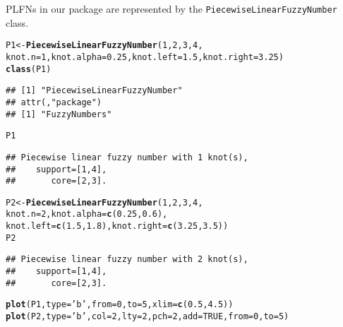 \documentclass[11pt]{article}\usepackage[]{graphicx}\usepackage[]{color}
\makeatletter
\newcommand{\hlnum}[1]{\textcolor[rgb]{0.686,0.059,0.569}{#1}}%
\newcommand{\hlstr}[1]{\textcolor[rgb]{0.192,0.494,0.8}{#1}}%
\newcommand{\hlstd}[1]{\textcolor[rgb]{0.345,0.345,0.345}{#1}}%
\newcommand{\hlkwb}[1]{\textcolor[rgb]{0.69,0.353,0.396}{#1}}%
\newcommand{\hlkwc}[1]{\textcolor[rgb]{0.333,0.667,0.333}{#1}}%
\newcommand{\hlkwd}[1]{\textcolor[rgb]{0.737,0.353,0.396}{\textbf{#1}}}%
\newenvironment{kframe}{%
 \def\at@end@of@kframe{}%
 \ifinner\ifhmode%
  \def\at@end@of@kframe{\end{minipage}}%
  \begin{minipage}{\columnwidth}%
 \fi\fi%
 \def\FrameCommand##1{\hskip\@totalleftmargin \hskip-\fboxsep
 \colorbox{shadecolor}{##1}\hskip-\fboxsep
     \hskip-\linewidth \hskip-\@totalleftmargin \hskip\columnwidth}%
 \MakeFramed {\advance\hsize-\width
   \@totalleftmargin\z@ \linewidth\hsize
   \@setminipage}}%
 {\par\unskip\endMakeFramed%
 \at@end@of@kframe}
\newenvironment{knitrout}{}{} %
\makeatother
\begin{document}
\bigskip
PLFNs in our package are represented by the \texttt{PiecewiseLinearFuzzyNumber} class.

\begin{knitrout}\small
{}\color{fgcolor}\begin{kframe}
\begin{alltt}
\hlstd{P1} \hlkwb{<-} \hlkwd{PiecewiseLinearFuzzyNumber}\hlstd{(}\hlnum{1}\hlstd{,} \hlnum{2}\hlstd{,} \hlnum{3}\hlstd{,} \hlnum{4}\hlstd{,}
   \hlkwc{knot.n}\hlstd{=}\hlnum{1}\hlstd{,} \hlkwc{knot.alpha}\hlstd{=}\hlnum{0.25}\hlstd{,} \hlkwc{knot.left}\hlstd{=}\hlnum{1.5}\hlstd{,} \hlkwc{knot.right}\hlstd{=}\hlnum{3.25}\hlstd{)}
\hlkwd{class}\hlstd{(P1)}
\end{alltt}
\begin{verbatim}
## [1] "PiecewiseLinearFuzzyNumber"
## attr(,"package")
## [1] "FuzzyNumbers"
\end{verbatim}
\begin{alltt}
\hlstd{P1}
\end{alltt}
\begin{verbatim}
## Piecewise linear fuzzy number with 1 knot(s),
##    support=[1,4],
##       core=[2,3].
\end{verbatim}
\begin{alltt}
\hlstd{P2} \hlkwb{<-} \hlkwd{PiecewiseLinearFuzzyNumber}\hlstd{(}\hlnum{1}\hlstd{,} \hlnum{2}\hlstd{,} \hlnum{3}\hlstd{,} \hlnum{4}\hlstd{,}
   \hlkwc{knot.n}\hlstd{=}\hlnum{2}\hlstd{,} \hlkwc{knot.alpha}\hlstd{=}\hlkwd{c}\hlstd{(}\hlnum{0.25}\hlstd{,}\hlnum{0.6}\hlstd{),}
   \hlkwc{knot.left}\hlstd{=}\hlkwd{c}\hlstd{(}\hlnum{1.5}\hlstd{,}\hlnum{1.8}\hlstd{),} \hlkwc{knot.right}\hlstd{=}\hlkwd{c}\hlstd{(}\hlnum{3.25}\hlstd{,} \hlnum{3.5}\hlstd{))}
\hlstd{P2}
\end{alltt}
\begin{verbatim}
## Piecewise linear fuzzy number with 2 knot(s),
##    support=[1,4],
##       core=[2,3].
\end{verbatim}
\begin{alltt}
\hlkwd{plot}\hlstd{(P1,} \hlkwc{type}\hlstd{=}\hlstr{'b'}\hlstd{,} \hlkwc{from}\hlstd{=}\hlnum{0}\hlstd{,} \hlkwc{to}\hlstd{=}\hlnum{5}\hlstd{,} \hlkwc{xlim}\hlstd{=}\hlkwd{c}\hlstd{(}\hlnum{0.5}\hlstd{,}\hlnum{4.5}\hlstd{))}
\hlkwd{plot}\hlstd{(P2,} \hlkwc{type}\hlstd{=}\hlstr{'b'}\hlstd{,} \hlkwc{col}\hlstd{=}\hlnum{2}\hlstd{,} \hlkwc{lty}\hlstd{=}\hlnum{2}\hlstd{,} \hlkwc{pch}\hlstd{=}\hlnum{2}\hlstd{,} \hlkwc{add}\hlstd{=}\hlnum{TRUE}\hlstd{,} \hlkwc{from}\hlstd{=}\hlnum{0}\hlstd{,} \hlkwc{to}\hlstd{=}\hlnum{5}\hlstd{)}
\end{alltt}
\end{kframe}
\end{knitrout}
\end{document}
